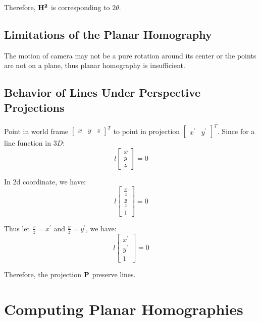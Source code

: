 \documentclass[11pt]{article} \usepackage{fullpage} \usepackage{graphicx} \usepackage{epstopdf} \usepackage{color} \usepackage{psfrag} \usepackage{pdfsync}\usepackage{indentfirst}\usepackage{subfigure}\usepackage{float}\usepackage[section]{placeins}
\begin{document}
Therefore, $\bold{H^2}$ is corresponding to $2\theta$.

\subsection{Limitations of the Planar Homography}

The motion of camera may not be a pure rotation around its center or the points are not on a plane, thus planar homography is insufficient.

\subsection{Behavior of Lines Under Perspective Projections}

Point in world frame $\left[ \begin{smallmatrix} x & y & z \end{smallmatrix} \right]^{T}$ to point in projection $\left[ \begin{smallmatrix} x^\prime & y^\prime \end{smallmatrix} \right]^{T}$. Since for a line function in $3D$: 
\begin{equation}
	l\begin{bmatrix}
		x \\ y \\ z
	\end{bmatrix} = 0
\end{equation}

In 2d coordinate, we have:
\begin{equation}
	l\begin{bmatrix}
		\frac{x}{z} \\ \frac{y}{z} \\ 1
	\end{bmatrix} = 0
\end{equation}

Thus let $\frac{x}{z} = x^\prime$ and $\frac{y}{z} = y^\prime$, we have:
\begin{equation}
	l\begin{bmatrix}
		x^\prime \\ y^\prime \\ 1
	\end{bmatrix} = 0
\end{equation}

Therefore, the projection $\bold{P}$ preserve lines.

\section{Computing Planar Homographies}
\setcounter{subsection}{0}
\end{document}
